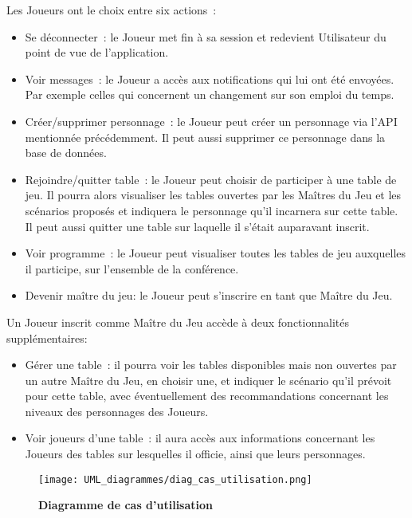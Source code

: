 \documentclass[11pt]{article}
\begin{document}
Les Joueurs ont le choix entre six actions~:
\begin{itemize}
    \item {Se déconnecter~: le Joueur met fin à sa session et redevient Utilisateur du point de vue de l'application.}
    \item{Voir messages~: le Joueur a accès aux notifications qui lui ont été envoyées. Par exemple celles qui concernent un changement sur son emploi du temps.}
    \item{Créer/supprimer personnage~: le Joueur peut créer un personnage via l'API mentionnée précédemment. Il peut aussi supprimer ce personnage dans la base de données.}
    \item{Rejoindre/quitter table~: le Joueur peut choisir de participer à une table de jeu. Il pourra alors visualiser les tables ouvertes par les Maîtres du Jeu et les scénarios proposés et indiquera le personnage qu'il incarnera sur cette table. Il peut aussi quitter une table sur laquelle il s'était auparavant inscrit.}
    \item{Voir programme~: le Joueur peut visualiser toutes les tables de jeu auxquelles il participe, sur l'ensemble de la conférence.}
    \item{Devenir maître du jeu: le Joueur peut s'inscrire en tant que Maître du Jeu.\\}
\end{itemize}

Un Joueur inscrit comme Maître du Jeu accède à deux fonctionnalités supplémentaires:
\begin{itemize}
    \item{Gérer une table~: il pourra voir les tables disponibles mais non ouvertes par un autre Maître du Jeu, en choisir une, et indiquer le scénario qu'il prévoit pour cette table, avec éventuellement des recommandations concernant les niveaux des personnages des Joueurs.}
    \item{Voir joueurs d'une table~: il aura accès aux informations concernant les Joueurs des tables sur lesquelles il officie, ainsi que leurs personnages.\\}
\end{itemize}

\begin{figure}[H]
    \caption{\textbf{Diagramme de cas d'utilisation}}
    \label{UML_classe_pipeline}
    \centering
    \texttt{[image: UML\_diagrammes/diag\_cas\_utilisation.png]}
\end{figure}
\end{document}
